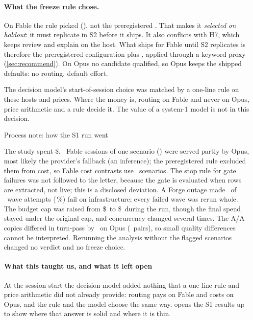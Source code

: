 \paragraph{What the freeze rule chose.} On Fable the rule picked \code{\SFreezeFable} (\SFreezeFableRatio\X), not the
preregistered \code{\SFreezeFablePrereg}. That makes it \emph{selected on holdout}: it must replicate in S2 before it
ships. It also conflicts with H7, which keeps review and explain on the host. What ships for Fable until S2 replicates is
therefore the preregistered configuration plus , applied through a keyword proxy
(\cref{sec:recommend}). On Opus no candidate qualified, so
Opus keeps the shipped defaults: no routing, default effort.

\begin{keyidea}
The decision model's start-of-session choice was matched by a one-line rule on these hosts and prices. Where the money
is, routing on Fable and never on Opus, price arithmetic and a rule decide it. The value of a system-1 model is not in
this decision.
\end{keyidea}

\begin{processnote}{Process note: how the S1 run went}
\raggedright The study spent \$\SSpend. \SGateFail\ Fable sessions of one scenario
(\code{\SGateScen}) were served partly by Opus, most likely the provider's fallback (an inference); the preregistered rule
excluded them from cost, so Fable cost contrasts use \SHOneN\ scenarios. The stop rule for gate failures was not followed
to the letter, because the gate is evaluated when rows are extracted, not live; this is a disclosed deviation. A Forge
outage made \SInfraAttempts\ of \SAttempts\ wave attempts (\SInfraPct\,\%) fail on infrastructure; every failed wave was
rerun whole. The budget cap was raised from \$\SBudgetOrig\ to \$\SBudgetFinal\ during the run, though the final spend
stayed under the original cap, and concurrency changed several times. The A/A copies differed in turn-pass by
\SNoiseOpusDtp\ on Opus (\SNoiseN\ pairs), so small quality differences cannot be interpreted. Rerunning the analysis
without the flagged scenarios changed no verdict and no freeze choice.
\end{processnote}

\paragraph{What this taught us, and what it left open} At the session start the decision model added nothing that a
one-line rule and price arithmetic did not already provide: routing pays on Fable and costs on Opus, and the rule
and the model choose the same way.  opens the S1 results up to show where that answer is solid and
where it is thin.
\fi
